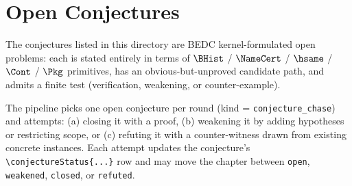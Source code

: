 \chapter{Open Conjectures}
\label{ch:conjectures-index}

The conjectures listed in this directory are BEDC kernel-formulated
open problems: each is stated entirely in terms of $\BHist$ / $\NameCert$
/ $\hsame$ / $\Cont$ / $\Pkg$ primitives, has an obvious-but-unproved
candidate path, and admits a finite test (verification, weakening, or
counter-example).

The pipeline picks one open conjecture per round (kind =
\texttt{conjecture\_chase}) and attempts: (a) closing it with a proof,
(b) weakening it by adding hypotheses or restricting scope, or (c)
refuting it with a counter-witness drawn from existing concrete
instances. Each attempt updates the conjecture's
\texttt{\textbackslash conjectureStatus\{...\}} row and may move the
chapter between \texttt{open}, \texttt{weakened}, \texttt{closed}, or
\texttt{refuted}.


